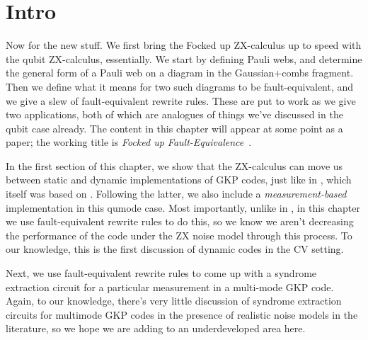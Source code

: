 \section{Intro}

Now for the new stuff.
We first bring the Focked up ZX-calculus up to speed with the qubit ZX-calculus, essentially.
We start by defining Pauli webs, and determine the general form of a Pauli web on a diagram in the Gaussian+combs fragment.
Then we define what it means for two such diagrams to be fault-equivalent, and we give a slew of fault-equivalent rewrite rules.
These are put to work as we give two applications, both of which are analogues of things we've discussed in the qubit case already.
The content in this chapter will appear at some point as a paper; the working title is \textit{Focked up Fault-Equivalence}~\cite{townsendteague2026fockedup}.

In the first section of this chapter, we show that the ZX-calculus can move us between static and dynamic implementations of GKP codes, just like in , which itself was based on .
Following the latter, we also include a \textit{measurement-based} implementation in this qumode case.
Most importantly, unlike in , in this chapter we use fault-equivalent rewrite rules to do this, so we know we aren't decreasing the performance of the code under the ZX noise model through this process.
To our knowledge, this is the first discussion of dynamic codes in the CV setting.

Next, we use fault-equivalent rewrite rules to come up with a syndrome extraction circuit for a particular measurement in a multi-mode GKP code.
Again, to our knowledge, there's very little discussion of syndrome extraction circuits for multimode GKP codes in the presence of realistic noise models in the literature, so we hope we are adding to an underdeveloped area here.
